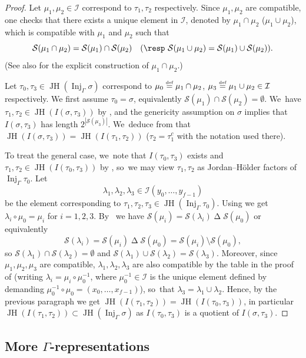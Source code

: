 \documentclass[JEP,XML,SOM,Unicode,NoFloatCountersInSection, NoEqCountersInSection,published]{cedram}
\newcommand{\defeq}{\stackrel{\textrm{\tiny{\upshape{def}}}}{=}}
\newcommand{\cI}{\mathcal{I}}
\newcommand{\cS}{\mathcal{S}}
\DeclareMathOperator{\Inj}{Inj}
\DeclareMathOperator{\JH}{\mathrm{JH}}
\theoremstyle{plain}
\theoremstyle{definition}
\begin{document}
\begin{proof}
Let $\mu_1,\mu_2\in \cI$ correspond to $\tau_1,\tau_2$ respectively. Since $\mu_1,\mu_2$ are compatible, one checks that there exists a unique element in $\cI$, denoted by $\mu_1\cap \mu_2$ (\resp $\mu_1\cup \mu_2$), which is compatible with $\mu_1$ and $\mu_2$ such that
\[
\cS(\mu_1\cap \mu_2)=\cS(\mu_1)\cap \cS(\mu_2)\quad (\text{\resp }\cS(\mu_1\cup \mu_2)=\cS(\mu_1)\cup \cS(\mu_2)).
\]
(See also \cite[\S 12]{BP} for the explicit construction of $\mu_1\cap \mu_2$.)

Let $\tau_{0}, \tau_{3}\in \JH(\Inj_\Gamma\sigma)$ correspond to $\mu_0\defeq\mu_1\cap \mu_2$, $\mu_3\defeq\mu_1\cup\mu_2\in\cI$ respectively.
We first assume $\tau_0=\sigma$, equivalently $\cS(\mu_1)\cap \cS(\mu_2)=\emptyset$. We~have $\tau_1,\tau_2\in \JH(I(\sigma,\tau_3))$ by \cite[Cor.\,4.11]{BP}, and the genericity assumption on $\sigma$ implies that $I(\sigma,\tau_3)$ has length $2^{|\cS(\mu_3)|}$. We~deduce from \cite[Lem.\,2.20(iii)]{HuWang} that $\JH(I(\sigma,\tau_3))=\JH(I(\tau_1,\tau_2))$ ($\tau_2=\tau_1^c$ with the notation used there).

To treat the general case, we~note that $I(\tau_0,\tau_3)$ exists and $\tau_1,\tau_2\in \JH(I(\tau_0,\tau_3))$ by \cite[Cor.\,4.11]{BP}, so~we may view $\tau_1,\tau_2$ as Jordan--Hölder factors of $\Inj_\Gamma\tau_0$.
Let
\[
\lambda_1,\lambda_2,\lambda_3\in\cI(y_0,\dots,y_{f-1})
\]
be the element corresponding to $\tau_1,\tau_2,\tau_3\in\JH(\Inj_\Gamma\tau_0)$.
Using \cite[Lem.\,2.1, 2.7]{HuWang2} we get $\lambda_i\circ\mu_0=\mu_i$ for $i=1,2,3$. By~\cite[Lem.\,2.6(i)]{HuWang2} we have $\cS(\mu_i)=\cS(\lambda_i)\mathbin\Delta\cS(\mu_0)$ or equivalently
\[
\cS(\lambda_i)=\cS(\mu_i)\mathbin\Delta\cS(\mu_0)=\cS(\mu_i)\setminus \cS(\mu_0),
\]
so $\cS(\lambda_1)\cap \cS(\lambda_2)=\emptyset$ and $\cS(\lambda_1)\cup \cS(\lambda_2)=\cS(\lambda_3)$.
Moreover, since $\mu_1,\mu_2,\mu_3$ are compatible, $\lambda_1,\lambda_2,\lambda_3$ are also compatible by the table in the proof of \cite[Lem.\,2.6]{HuWang2} (writing $\lambda_i = \mu_i \circ \mu_0^{-1}$, where $\mu_0^{-1}\in\cI$ is the unique element defined by demanding $\mu_0^{-1}\circ \mu_0=(x_0,\dots,x_{f-1})$), so~that $\lambda_3=\lambda_1\cup \lambda_2$.
Hence, by the previous paragraph we get $\JH(I(\tau_1,\tau_2))=\JH(I(\tau_0,\tau_3))$, in particular $\JH(I(\tau_1,\tau_2))\subset \JH(\Inj_\Gamma\sigma)$ as $I(\tau_0,\tau_3)$ is a quotient of $I(\sigma,\tau_3)$.
\end{proof}

\subsection{More \texorpdfstring{$\Gamma$}{Gamma}-representations}
\label{sec:more-gamma-repr}
\end{document}
